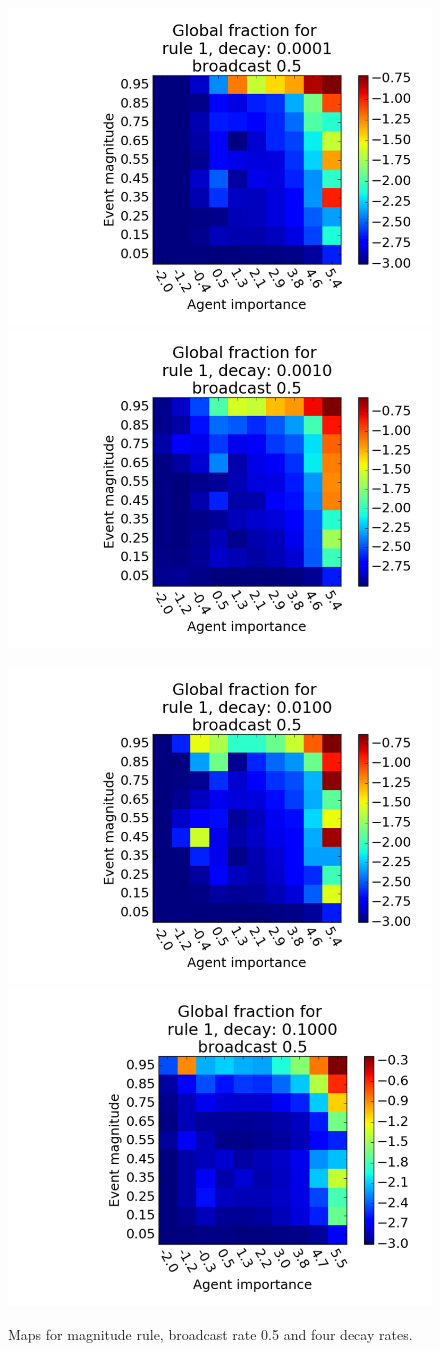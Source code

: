 \documentclass [12pt,a4paper,twoside]{article}
\begin{document}
\begin{figure}[H]
  \centering
  \includegraphics[width=0.45\linewidth]{report/r1d0001b05.png}
  \includegraphics[width=0.45\linewidth]{report/r1d001b05.png}  
\end{figure}

\begin{figure}[h!]
  \centering
  \includegraphics[width=0.45\linewidth]{report/r1d01b05.png}
  \includegraphics[width=0.45\linewidth]{report/r1d1b05.png}
  \caption{Maps for magnitude rule, broadcast rate 0.5 and four decay rates.}
  \label{decay1}
\end{figure}
\end{document}
